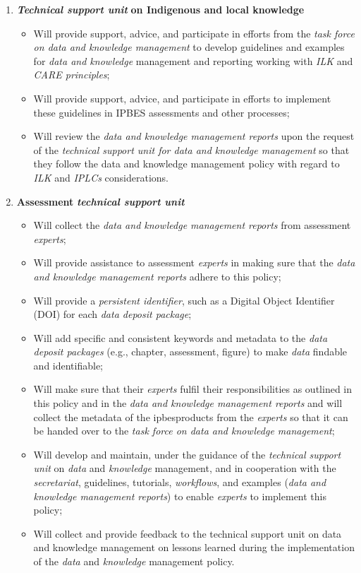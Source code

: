\documentclass{article}
\begin{document}
\begin{enumerate}[label=(\alph*)]
    \item \textit{\textbf{Technical support unit}}\textbf{ on Indigenous and local knowledge}
    \begin{itemize}
        \item Will provide support, advice, and participate in efforts from the \textit{task force on data and knowledge management} to develop guidelines and examples for \textit{data and knowledge} management and reporting working with\textit{ ILK} and \textit{CARE principles};
        \item Will provide support, advice, and participate in efforts to implement these guidelines in IPBES assessments and other processes;
        \item Will review the \textit{data and knowledge management reports} upon the request of the \textit{technical support unit for data and knowledge management} so that they follow the data and knowledge management policy with regard to \textit{ILK} and \textit{IPLCs} considerations.
\end{itemize}

    \item \textbf{Assessment }\textit{\textbf{technical support unit}}
    \begin{itemize}
        \item Will collect the \textit{data and knowledge management reports} from assessment \textit{experts};
        \item Will provide assistance to assessment \textit{experts} in making sure that the \textit{data and knowledge management reports} adhere to this policy;
        \item Will provide a \textit{persistent identifier}, such as a Digital Object Identifier (DOI) for each \textit{data deposit package};
        \item Will add specific and consistent keywords and metadata to the \textit{data deposit packages} (e.g., chapter, assessment, figure) to make \textit{data} findable and identifiable;
        \item Will make sure that their \textit{experts} fulfil their responsibilities as outlined in this policy and in the \textit{data and knowledge management reports} and will collect the metadata of the \gls{ipbesproducts} from the \textit{experts} so that it can be handed over to the \textit{task force on data and knowledge management};
        \item Will develop and maintain, under the guidance of the \textit{technical support unit} on \textit{data} and \textit{knowledge} management, and in cooperation with the \textit{secretariat}, guidelines, tutorials, \textit{workflows}, and examples (\textit{data and knowledge management reports}) to enable \textit{experts} to implement this policy;
        \item Will collect and provide feedback to the {technical support unit on data and knowledge management} on lessons learned during the implementation of the \textit{data} and \textit{knowledge} management policy.
    \end{itemize}


\end{enumerate}
\end{document}
